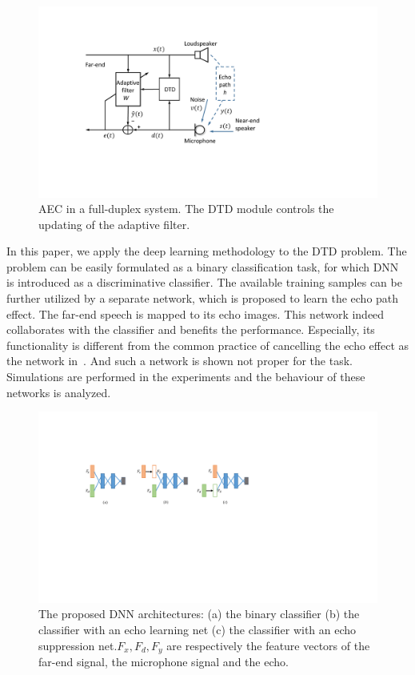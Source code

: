 \documentclass[a4paper]{article}
\begin{document}
\begin{figure}[t]
  \centering
  \includegraphics[width=0.95\linewidth]{fig1_aec.pdf}
  \caption{AEC in a full-duplex system. The DTD module controls the updating of the adaptive filter.}
  \label{fig1}
\end{figure}

In this paper, we apply the deep learning methodology to the DTD problem. The problem can be easily formulated as a binary classification task, for which DNN is introduced as a discriminative classifier. The available training samples can be further utilized by a separate network, which is proposed to learn the echo path effect. The far-end speech is mapped to its echo images. This network indeed collaborates with the classifier and benefits the performance. Especially, its functionality is different from the common practice of cancelling the echo effect as the network in~\cite{lee2015dnn}. And such a network is shown not proper for the task. Simulations are performed in the experiments and the behaviour of these networks is analyzed.

\begin{figure}[t]
  \centering
  \includegraphics[width=0.9\linewidth]{fig2_nn.pdf}
  \caption{The proposed DNN architectures: (a) the binary classifier (b) the classifier with an echo learning net (c) the classifier with an echo suppression net.$F_x,F_d,F_y$ are respectively the feature vectors of the far-end signal, the microphone signal and the echo.}
  \label{fig2}
\end{figure}
\end{document}
